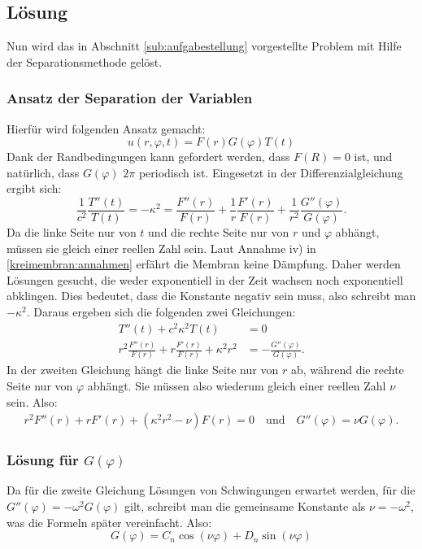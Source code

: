 \subsection{Lösung\label{sub:lösung1}}
Nun wird das in Abschnitt \ref{sub:aufgabestellung} vorgestellte Problem mit Hilfe der Separationsmethode gelöst.
\subsubsection{Ansatz der Separation der Variablen\label{subsub:ansatz_separation}}
Hierfür wird folgenden Ansatz gemacht:
\begin{equation*}
	u(r,\varphi, t) = F(r)G(\varphi)T(t)
\end{equation*}
Dank der Randbedingungen kann gefordert werden, dass $F(R)=0$ ist, und natürlich, dass $G(\varphi)$ $2\pi$ periodisch ist. Eingesetzt in der Differenzialgleichung ergibt sich:
\begin{equation*}
	\frac{1}{c^2}\frac{T''(t)}{T(t)}=-\kappa^2=\frac{F''(r)}{F(r)}+\frac{1}{r}\frac{F'(r)}{F(r)}+\frac{1}{r^2}\frac{G''(\varphi)}{G(\varphi)}.
\end{equation*}
Da die linke Seite nur von $t$ und die rechte Seite nur von $r$ und $\varphi$ abhängt, müssen sie gleich einer reellen Zahl sein. 
Laut Annahme iv) in \ref{kreimembran:annahmen} erfährt die Membran keine Dämpfung.
Daher werden Lösungen gesucht, die weder exponentiell in der Zeit wachsen noch exponentiell abklingen. 
Dies bedeutet, dass die Konstante negativ sein muss, also schreibt man $-\kappa^2$. Daraus ergeben sich die folgenden zwei Gleichungen:
\begin{align*}
	T''(t) + c^2\kappa^2T(t) &= 0\\
	r^2\frac{F''(r)}{F(r)} + r \frac{F'(r)}{F(r)} +\kappa^2 r^2 &= - \frac{G''(\varphi)}{G(\varphi)}.
\end{align*}
In der zweiten Gleichung hängt die linke Seite nur von $r$ ab, während die rechte Seite nur von $\varphi$ abhängt. Sie müssen also wiederum gleich einer reellen Zahl $\nu$ sein. Also:
\begin{align*}
	r^2F''(r) + rF'(r) + (\kappa^2 r^2 - \nu)F(r) = 0 \quad \text{und} \quad
	G''(\varphi) = \nu G(\varphi).
\end{align*}

\subsubsection{Lösung für $G(\varphi)$\label{subsub:lösung_G}}
Da für die zweite Gleichung Lösungen von Schwingungen erwartet werden, für die $G''(\varphi)=-\omega^2 G(\varphi)$ gilt, schreibt man die gemeinsame Konstante als $\nu=-\omega^2$, was die Formeln später vereinfacht. Also:
\begin{equation*}
 G(\varphi) = C_n \cos(\nu\varphi) + D_n \sin(\nu\varphi)
 \label{eq:cos_sin_überlagerung}
\end{equation*}


